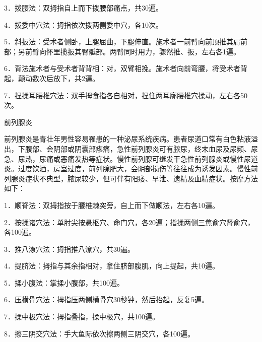 \documentclass[12pt,UTF8,openany]{ctexbook}
\begin{document}
3．拨腰法：双拇指自上而下拨腰部痛点，共30遍。

4．拨委中穴法：拇指依次拨两侧委中穴，各10次。

5．斜扳法：受术者侧卧，上腿屈曲，下腿伸直。施术者一前臂向前顶推其肩前部；另前臂向怀里揽扳其臀骶部。两臂同时用力，骤然推、扳，左右各1遍。

6．背法施术者与受术者背背相：对，双臂相挽。施术者向前弯腰，将受术者背起，颠动数次后放下，共2遍。

7．捏揉耳腰椎穴法：双手拇食指各自相对，捏住两耳廓腰椎穴揉动，左右各50次。

前列腺炎

前列腺炎是青壮年男性容易罹患的一种泌尿系统疾病。患者尿道口常有白色粘液溢出，下腹部、会阴部或阴囊部疼痛，急性前列腺炎可有脓尿，终末血尿及尿频、尿急、尿热，尿痛或恶痛发热等症状。慢性前列腺可继发干急性前列腺炎或慢性尿道炎。过度饮酒，房室过度，前列腺肥大，会阴部损伤等往往成为诱发因素。慢性前列腺炎症状不典型，脓尿较少，但可伴有阳痿、早泄、遗精及血精症状。按摩方法如下：

1．顺脊法：双拇指按于腰椎棘突旁，自上而下做顺法，左右各10遍。

2．按揉诸穴法：单肘尖按悬枢穴、命门穴，各20遍；指揉两侧三焦俞穴肾俞穴，各100遍。

3．推八潦穴法：拇指推八潦穴，共30遍。

4．提脐法：拇指与其余指相对，拿住脐部腹肌，向上提起，共10遍。

5．揉小腹法：掌揉小腹部，共100遍。

6．压横骨穴法：拇指压两侧横骨穴30秒钟，然后抬起，反复5遍。

7．揉中极穴法：拇指叠指，揉中极穴，共100遍。

8．擦三阴交穴法：手大鱼际依次擦两侧三阴交穴，各100遍。
\end{document}
